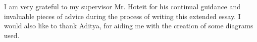 \documentclass[12pt, oneside]{article}
\begin{document}
I am very grateful to my supervisor Mr. Hoteit for his continual guidance and invaluable pieces of advice during the process of writing this extended essay. I would also like to thank Aditya, for aiding me with the creation of some diagrams used.

\clearpage
\pagestyle{backmatter}

\printbibliography[heading=bibintoc]{}


\clearpage
\begin{appendices}
    \pagestyle{appendices}
    
    
    
    
\end{appendices}
\end{document}
